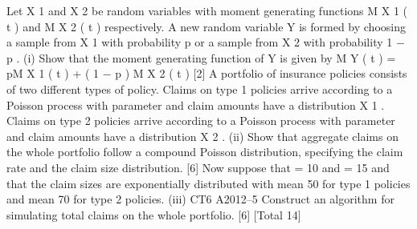 \documentclass[a4paper,12pt]{article}
\begin{document}
Let X 1 and X 2 be random variables with moment generating functions M X 1 ( t ) and
M X 2 ( t ) respectively. A new random variable Y is formed by choosing a sample
from X 1 with probability p or a sample from X 2 with probability 1 − p .
(i)
Show that the moment generating function of Y is given by
M Y ( t ) = pM X 1 ( t ) + ( 1 − p ) M X 2 ( t )
[2]
A portfolio of insurance policies consists of two different types of policy. Claims on
type 1 policies arrive according to a Poisson process with parameter  and claim
amounts have a distribution X 1 . Claims on type 2 policies arrive according to a
Poisson process with parameter  and claim amounts have a distribution X 2 .
(ii)
Show that aggregate claims on the whole portfolio follow a compound Poisson
distribution, specifying the claim rate and the claim size distribution.
[6]
Now suppose that  = 10 and  = 15 and that the claim sizes are exponentially
distributed with mean 50 for type 1 policies and mean 70 for type 2 policies.
(iii)
CT6 A2012–5
Construct an algorithm for simulating total claims on the whole portfolio. [6]
[Total 14]

\newpage
\end{document}
